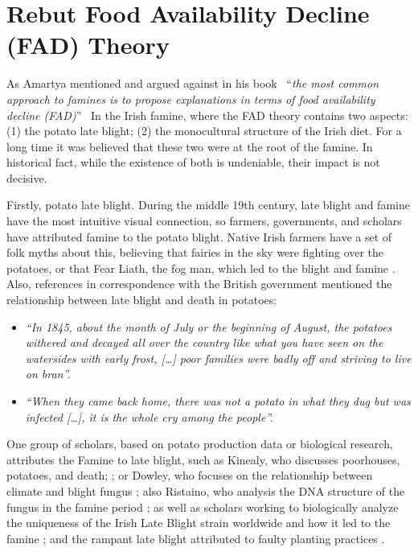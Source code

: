 \section{Rebut Food Availability Decline (FAD) Theory}

As Amartya mentioned and argued against in his book \textendash\ ``\textit{the most common approach to famines is to propose explanations in terms of food availability decline (FAD)}'' \citep{sen1982poverty} \textendash\ In the Irish famine, where the FAD theory contains two aspects: (1) the potato late blight; (2) the monocultural structure of the Irish diet. For a long time it was believed that these two were at the root of the famine. In historical fact, while the existence of both is undeniable, their impact is not decisive.

Firstly, potato late blight. During the middle 19th century, late blight and famine have the most intuitive visual connection, so farmers, governments, and scholars have attributed famine to the potato blight. Native Irish farmers have a set of folk myths about this, believing that fairies in the sky were fighting over the potatoes, or that Fear Liath, the fog man, which led to the blight and famine \citep{bartoletti2001black}. Also, references in correspondence with the British government mentioned the relationship between late blight and death in potatoes:

\begin{itemize}
    \item[] \textit{``In 1845, about the month of July or the beginning of August, the potatoes withered and decayed all over the country like what you have seen on
    the watersides with early frost, [\ldots] poor families were badly off and striving to live on bran''.} \citep{mcclureletter1848}
    \item[] \textit{``When they came back home, there was not a potato in what they dug but was infected [\ldots], it is the whole cry among the people''.} \citep{blackwellletter1845}
\end{itemize}

One group of scholars, based on potato production data or biological research, attributes the Famine to late blight, such as Kinealy, who discusses poorhouses, potatoes, and death; \citep{kinealy1990irish}; or Dowley, who focuses on the relationship between climate and blight fungus \citep{dowley1997potato}; also Ristaino, who analysis the DNA structure of the fungus in the famine period \citep{ristaino2006tracking}; as well as scholars working to biologically analyze the uniqueness of the Irish Late Blight strain worldwide and how it led to the famine \citep{goss2014irish}; and the rampant late blight attributed to faulty planting practices \citep{lidwell2020cultivating}.

